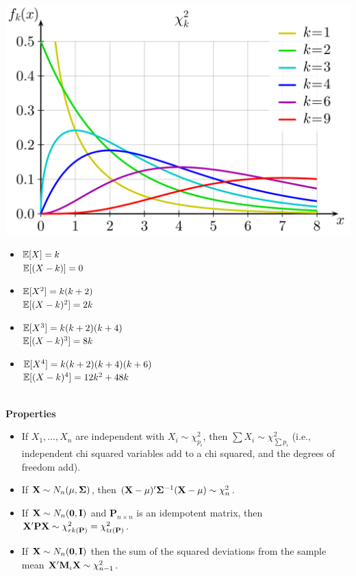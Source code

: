 \documentclass[DIV=14,titlepage=false]{scrreprt}
\begin{document}
\begin{minipage}[c]{0.5\textwidth}
  \includegraphics[width=\textwidth]{./Images/chisquared.png}
  \end{minipage}
  \hfill
\begin{minipage}[c]{0.45\textwidth}
 \begin{itemize}
  \item $ \mathbb{E} [X] = k $\\
  $ \mathbb{E}[(X - k)] = 0 $
  \item $ \mathbb{E} [X^2] = k(k+2) $\\
  $ \mathbb{E}[(X - k)^2] = 2k $
  \item $ \mathbb{E}[ X^3] = k(k+2)(k+4) $\\
  $ \mathbb{E}[(X - k)^3] = 8k$ 
  \item $ \mathbb{E} [X^4] = k(k+2)(k+4)(k+6) $\\
  $\mathbb{E}[(X - k)^4] = 12k^2+48k$
 \end{itemize}
\end{minipage}\\

\textbf{Properties}

\begin{itemize}
  \item If $ X_1, \dotsc, X_n $ are independent with $ X_i \sim \chi^2_{p_i} $, then $ \sum X_i \sim \chi^2_{\sum p_i} $ (i.e., independent chi squared variables add to a chi squared, and the degrees of freedom add).
  \item If $ \mathbf{X} \sim N_n (\mathbf{\mu}, \mathbf{\Sigma}) $, then $ (\mathbf{X} - \mathbf{\mu})' \mathbf{\Sigma}^{-1} (\mathbf{X} - \mathbf{\mu}) \sim \chi^2_n $.
  \item If $ \mathbf{X} \sim N_n (\mathbf{0}, \mathbf{I}) $ and $ \mathbf{P}_{n \times n} $ is an idempotent matrix, then $ \mathbf{X}' \mathbf{P} \mathbf{X} \sim \chi^2_{rk (\mathbf{P})} = \chi^2_{\operatorname{tr} (\mathbf{P})} $.
  \item If $ \mathbf{X} \sim N_n (\mathbf{0}, \mathbf{I}) $ then the sum of the squared deviations from the sample mean $ \mathbf{X}' \mathbf{M}_{\mathbf{\iota}} \mathbf{X} \sim \chi^2_{n-1} $.
\end{itemize}
\end{document}
